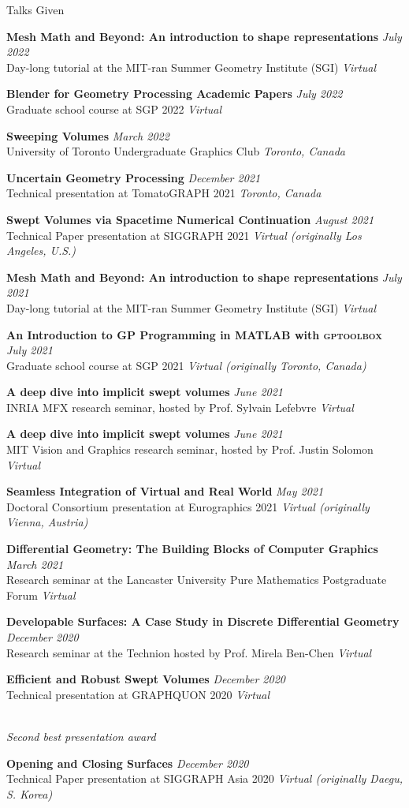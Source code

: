 \documentclass{resume}
\newcommand{\talk}[4]{
    {\bf #1} \hfill {\em \small #2} \\ %
    {\small #3} \hfill {\em \small #4}
}
\begin{document}
\begin{rSection}{Talks Given}

\talk{Mesh Math and Beyond: An introduction to shape representations}{July 2022}{Day-long tutorial at the MIT-ran Summer Geometry Institute (SGI)}{Virtual}

\talk{Blender for Geometry Processing Academic Papers}{July 2022}{Graduate school course at SGP 2022}{Virtual}

\talk{Sweeping Volumes}{March 2022}
{University of Toronto Undergraduate Graphics Club}{Toronto, Canada}

\talk{Uncertain Geometry Processing}{December 2021}
{Technical presentation at TomatoGRAPH 2021}{Toronto, Canada}

\talk{Swept Volumes via Spacetime Numerical Continuation}{August 2021}
{Technical Paper presentation at SIGGRAPH 2021}{Virtual (originally Los Angeles, U.S.)}

\talk{Mesh Math and Beyond: An introduction to shape representations}{July 2021}
{Day-long tutorial at the MIT-ran Summer Geometry Institute (SGI)}{Virtual}

\talk{An Introduction to GP Programming in MATLAB with \textsc{gptoolbox}}{July 2021}
{Graduate school course at SGP 2021}{Virtual (originally Toronto, Canada)}

\talk{A deep dive into implicit swept volumes}{June 2021}
{INRIA MFX research seminar, hosted by Prof. Sylvain Lefebvre}{Virtual}

\talk{A deep dive into implicit swept volumes}{June 2021}
{MIT Vision and Graphics research seminar, hosted by Prof. Justin Solomon}{Virtual}

\talk{Seamless Integration of Virtual and Real World}{May 2021}
{Doctoral Consortium presentation at Eurographics 2021}{Virtual (originally Vienna, Austria)}

\talk{Differential Geometry: The Building Blocks of Computer Graphics}{March 2021}
{Research seminar at the Lancaster University Pure Mathematics Postgraduate Forum}{Virtual}

\talk{Developable Surfaces: A Case Study in Discrete Differential Geometry}{December 2020}
{Research seminar at the Technion hosted by Prof. Mirela Ben-Chen}{Virtual}

\talk{Efficient and Robust Swept Volumes}{December 2020}
{Technical presentation at GRAPHQUON 2020}{Virtual}
\\{\it Second best presentation award}

\talk{Opening and Closing Surfaces}{December 2020}
{Technical Paper presentation at SIGGRAPH Asia 2020}{Virtual (originally Daegu, S. Korea)}


\end{rSection}
\end{document}
